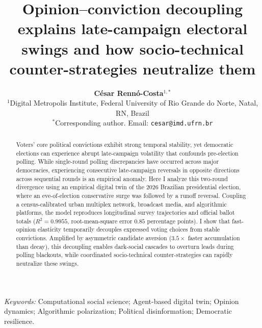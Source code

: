 \documentclass[11pt,a4paper]{article}
\title{\textbf{\Large Opinion–conviction decoupling explains late-campaign electoral swings and how socio-technical counter-strategies neutralize them}}
\author{
    \textbf{César Rennó-Costa}$^{1,*}$ \\[0.8em]
    $^{1}$Digital Metropolis Institute, Federal University of Rio Grande do Norte, Natal, RN, Brazil \\
    $^{*}$Corresponding author. Email: \texttt{cesar@imd.ufrn.br}
}
\date{}
\begin{document}
\maketitle

\begin{abstract}
Voters' core political convictions exhibit strong temporal stability, yet democratic elections can experience abrupt late-campaign volatility that confounds pre-election polling. While single-round polling discrepancies have occurred across major democracies, experiencing consecutive late-campaign reversals in opposite directions across sequential rounds is an empirical anomaly. Here I analyze this two-round divergence using an empirical digital twin of the 2026 Brazilian presidential election, where an eve-of-election conservative surge was followed by a runoff reversal. Coupling a census-calibrated urban multiplex network, broadcast media, and algorithmic platforms, the model reproduces longitudinal survey trajectories and official ballot totals ($R^2 = 0.9955$, root-mean-square error $0.85$ percentage points). I show that fast-opinion elasticity temporarily decouples expressed voting choices from stable convictions. Amplified by asymmetric candidate aversion ($3.5\times$ faster accumulation than decay), this decoupling enables dark-social cascades to overturn leads during polling blackouts, while coordinated socio-technical counter-strategies can rapidly neutralize these swings.
\end{abstract}

\vspace{0.8em}
\noindent\textit{Keywords:} Computational social science; Agent-based digital twin; Opinion dynamics; Algorithmic polarization; Political disinformation; Democratic resilience.

\vspace{1.5em}
\end{document}
